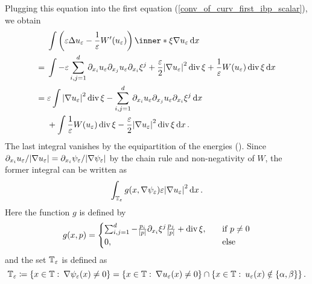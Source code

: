 Plugging this equation into the first equation 
(\ref{conv_of_curv_first_ibp_scalar}), we obtain
\begin{align}
	& \int
	\left(
	\varepsilon \Delta u_{ \varepsilon }
	-
	\frac{ 1 }{ \varepsilon }
	W'( u_{ \varepsilon } ) 
	\right)
	\inner*{ \xi }{ \nabla u_{ \varepsilon } }
	\dd{ x }
	\notag
	\\
	\label{curvature_term_equality_which_bounds}
	={} &
	\int
	-\varepsilon \sum_{ i, j = 1}^{ d }
	\partial_{ x_{ i } } u_{ \varepsilon }
	\partial_{ x_{ j } } u_{ \varepsilon }
	\partial_{ x_{ i } } \xi^{ j } 
	+
	\frac{ \varepsilon }{ 2 }
	\abs{ \nabla u_{ \varepsilon } }^{ 2 }
	\divg \xi 
	+
	\frac{ 1 }{ \varepsilon }
	W ( u_{ \varepsilon } ) 
	\divg \xi 
	\dd{ x }
	\\
	= {} &
	\varepsilon
	\int
	\abs{ \nabla u_{ \varepsilon } }^{ 2 }
	\divg \xi 
	-
	\sum_{ i, j = 1 }^{ d }
	\partial_{ x_{ i } } u_{ \varepsilon }
	\partial_{ x_{ j } } u_{ \varepsilon }
	\partial_{ x_{ i } } \xi^{ j }
	\dd{ x }
	\notag
	\\
	& + 
	\int
	\frac{ 1 }{ \varepsilon }
	W ( u_{ \varepsilon } )
	\divg \xi 
	-
	\frac{ \varepsilon }{ 2 }
	\abs{ \nabla u_{ \varepsilon } }^{ 2 }
	\divg \xi
	\dd{ x }
	\notag.
\end{align}
The last integral vanishes by the equipartition of the energies 
().
Since $ \partial_{ x_{ i } } u_{ \varepsilon } / \abs{ \nabla u_{ \varepsilon } 
} = \partial_{ x_{ i } } \psi_{ \varepsilon } / \abs{ \nabla \psi_{ 
\varepsilon  } } $ by the chain rule and non-negativity of $ W $, the former 
integral can be written as
\begin{equation}
	\label{conv_of_curv_scalar_written_as_g}
	\int_{ \operatorname{\mathbb{T}}_{ \varepsilon } }
	g ( x , \nabla \psi_{ \varepsilon } )
	\varepsilon \abs{ \nabla u_{ \varepsilon } }^{ 2 }
	\dd{ x }.
\end{equation}
Here the function $ g $ is defined by
\begin{equation*}
	g ( x, p )
	=
	\begin{cases}
		\sum_{ i, j = 1}^{ d }
		-
		\frac{ p_{ i } }{ \abs{ p } }
		\partial_{ x_{ i } } \xi^{ j }
		\frac{ p_{ j } }{ \abs{ p } }
		+
		\operatorname{div} \xi,
		\quad
		&\text{if } p \neq 0
		\\
		0,
		&\text{else}
	\end{cases}
\end{equation*}
and the set $ \operatorname{\mathbb{T}}_{ \varepsilon } $ is defined as
\begin{equation*}
	\operatorname{\mathbb{T}}_{ \varepsilon }
	\coloneqq
	\left\{
	x \in \operatorname{\mathbb{T}}
	\, \colon \,
	\nabla \psi_{ \varepsilon } ( x ) \neq 0
	\right\}
	=
	\left\{
	x \in \operatorname{\mathbb{T}}
	\, \colon \,
	\nabla u_{ \varepsilon } ( x ) \neq 0 
	\right\}
	\cap
	\left\{
	x \in \operatorname{\mathbb{T}}
	\, \colon \,
	u_{ \varepsilon } ( x ) \notin \{ \alpha , \beta \}
	\right\}.
\end{equation*}
